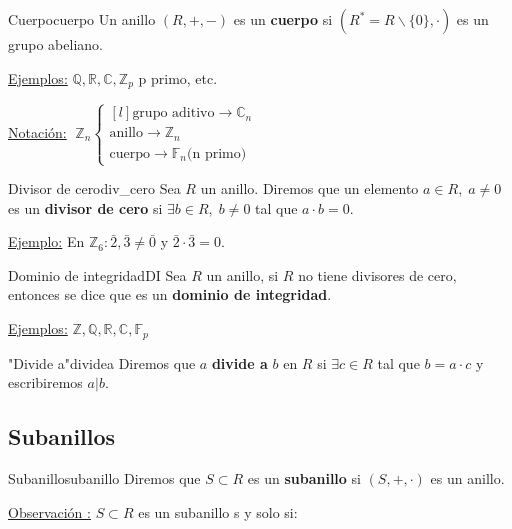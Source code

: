 \documentclass[10pt, a4paper]{article}
\newcommand{\R}{\mathbb{R}}
\newcommand{\Z}{\mathbb{Z}}
\newcommand{\C}{\mathbb{C}}
\newcommand{\Q}{\mathbb{Q}}
\newcommand{\F}{\mathbb{F}}
\newcommand{\obs}[1][\!\!]{ \underline{Observación #1:} }
\newcommand{\ej}{\underline{Ejemplo:} }
\newcommand{\ejs}{\underline{Ejemplos:} }
\begin{document}
\begin{definition}{Cuerpo}{cuerpo}
Un anillo $(R, +, -)$ es un \textbf{cuerpo} si $(R^* = R \backslash \{0\}, \cdot)$ es un grupo abeliano.
\end{definition}

\underline{Ejemplos:} $\Q, \R, \C, \Z_p$ p primo, etc.

\vspace{3mm}

\underline{Notación:} $\; \Z_n  \left \{
\begin{matrix*}[l]
\textrm{grupo aditivo} \rightarrow \C_n \\
\textrm{anillo} \rightarrow \Z_n \\
\textrm{cuerpo} \rightarrow \mathbb{F}_n \textrm{(n primo)}
\end{matrix*} \right .$

\begin{definition}{Divisor de cero}{div_cero}
Sea $R$ un anillo. Diremos que un elemento $a \in R, \; a \neq 0$ es un \textbf{divisor de cero} si $\exists b \in R, \; b \neq 0$ tal que $a \cdot b = 0$.
\end{definition}

\ej En $\Z_6: \bar{2}, \bar{3} \neq \bar{0}$ y $\bar{2} \cdot \bar{3} = 0$.

\begin{definition}{Dominio de integridad}{DI}
Sea $R$ un anillo, si $R$ no tiene divisores de cero, entonces se dice que es un \textbf{dominio de integridad}.
\end{definition}

\ejs $\Z, \Q, \R, \C, \F_p$

\begin{definition}{"Divide a"}{dividea}
Diremos que $a$ \textbf{divide a} $b$ en $R$ si $\exists c \in R$ tal que $b = a \cdot c$ y escribiremos $a | b$.
\end{definition}

\subsection{Subanillos}

\vspace{3mm}

\begin{definition}{Subanillo}{subanillo}
Diremos que $S \subset R$ es un \textbf{subanillo} si $(S, +, \cdot)$ es un anillo.
\end{definition}

\obs $S \subset R$ es un subanillo s y solo si:
\end{document}

